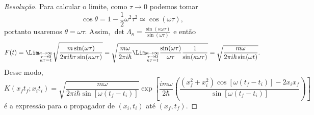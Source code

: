 \begin{proof}[Resolução]
   Para calcular o limite, como \(\tau \to 0\) podemos tomar
   \begin{equation*}
       \cos\theta = 1 - \frac12 \omega^2 \tau^2 \simeq \cos(\omega \tau),
   \end{equation*}
   portanto usaremos \(\theta = \omega \tau\). Assim, \(\det{\Lambda_\kappa} = \frac{\sin(\kappa \omega \tau)}{\sin(\omega \tau)}\) e então
   \begin{equation*}
      F(t) 
      = \Lim_{\substack{\kappa \to \infty\\ \tau \to 0\\ \kappa \tau = t}}{\sqrt{\frac{m \sin(\omega \tau)}{2\pi i \hbar \tau \sin(\kappa \omega \tau)}}} = \sqrt{\frac{m \omega}{2\pi i \hbar} \Lim_{\substack{\kappa \to \infty\\ \tau \to 0\\ \kappa \tau = t}}{\frac{\sin(\omega \tau)}{\omega \tau} \frac{1}{\sin(\kappa \omega \tau)}}} = \sqrt{\frac{m \omega}{2 \pi i \hbar \sin(\omega t)}}.
   \end{equation*}
   Desse modo,
   \begin{equation*}
      K(x_ft_f; x_it_i) =\sqrt{\frac{m \omega}{2 \pi i \hbar \sin[\omega (t_f - t_i)]}}\exp\left[\frac{i m \omega}{2 \hbar}\left(\frac{(x_f^2 + x_i^2) \cos[\omega (t_f - t_i)] - 2x_i x_f}{\sin[\omega (t_f - t_i)]}\right)\right]
   \end{equation*}
   é a expressão para o propagador de \((x_i,t_i)\) até \((x_f, t_f)\).
\end{proof}
